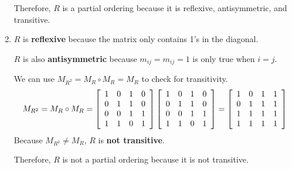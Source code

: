 \documentclass[11pt]{article}
\begin{document}
\begin{enumerate}
    Therefore, $R$ is a partial ordering because it is reflexive, antisymmetric, and transitive.
    
    \item $R$ is \textbf{reflexive} because the matrix only contains 1's in the diagonal.
    
    $R$ is also \textbf{antisymmetric} because $m_{ij} = m_{ij} = 1$ is only true when $i = j$.
    
    We can use $M_{R^2} = M_R \circ M_R = M_R$ to check for transitivity.
    \[
    M_{R^2} = M_R \circ M_R =
    \left[
    \begin{array}{c c c c}
         1 & 0 & 1 & 0 \\
         0 & 1 & 1 & 0 \\
         0 & 0 & 1 & 1 \\
         1 & 1 & 0 & 1
    \end{array}
    \right]
    \left[
    \begin{array}{c c c c}
         1 & 0 & 1 & 0 \\
         0 & 1 & 1 & 0 \\
         0 & 0 & 1 & 1 \\
         1 & 1 & 0 & 1
    \end{array}
    \right]
    =
    \left[
    \begin{array}{c c c c}
         1 & 0 & 1 & 1 \\
         0 & 1 & 1 & 1 \\
         1 & 1 & 1 & 1 \\
         1 & 1 & 1 & 1
    \end{array}
    \right]
    \]
    Because $M_{R^2} \neq M_R$, $R$ is \textbf{not transitive}.
    
    Therefore, $R$ is not a partial ordering because it is not transitive.
\end{enumerate}
\end{document}

